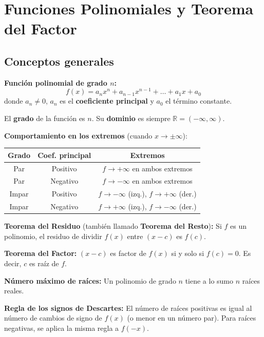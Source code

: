 \documentclass[12pt, letterpaper]{article}
\begin{document}

\section{Funciones Polinomiales y Teorema del Factor}

\subsection{Conceptos generales}

\begin{cuadroteoria}
  \textbf{Función polinomial de grado $n$:}
  $$f(x) = a_n x^n + a_{n-1}x^{n-1} + \dots + a_1 x + a_0$$
  donde $a_n \neq 0$, $a_n$ es el \textbf{coeficiente principal} y $a_0$ el término constante.

  El \textbf{grado} de la función es $n$. Su \textbf{dominio} es siempre $\mathbb{R} = (-\infty, \infty)$.

  \textbf{Comportamiento en los extremos} (cuando $x \to \pm\infty$):
  \begin{center}
    \begin{tabular}{ccc}
      \toprule
      \textbf{Grado} & \textbf{Coef. principal} & \textbf{Extremos}                              \\
      \midrule
      Par            & Positivo                 & $f \to +\infty$ en ambos extremos              \\
      Par            & Negativo                 & $f \to -\infty$ en ambos extremos              \\
      Impar          & Positivo                 & $f \to -\infty$ (izq.), $f \to +\infty$ (der.) \\
      Impar          & Negativo                 & $f \to +\infty$ (izq.), $f \to -\infty$ (der.) \\
      \bottomrule
    \end{tabular}
  \end{center}
\end{cuadroteoria}

\newpage

\begin{cuadrosolucion}
  \textbf{Teorema del Residuo} (también llamado \textbf{Teorema del Resto})\textbf{:} Si $f$ es un polinomio, el residuo de dividir $f(x)$ entre $(x - c)$ es $f(c)$.

  \textbf{Teorema del Factor:} $(x - c)$ es factor de $f(x)$ si y solo si $f(c) = 0$. Es decir, $c$ es raíz de $f$.

  \textbf{Número máximo de raíces:} Un polinomio de grado $n$ tiene a lo sumo $n$ raíces reales.

  \textbf{Regla de los signos de Descartes:} El número de raíces positivas es igual al número de cambios de signo de $f(x)$ (o menor en un número par). Para raíces negativas, se aplica la misma regla a $f(-x)$.
\end{cuadrosolucion}
\end{document}
